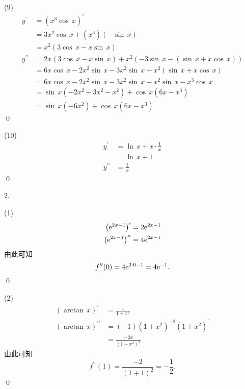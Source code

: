 (9) \solve
\begin{align}
    y^\prime &= \left(x^3\cos \, x\right)^\prime \\
    &=3x^2\cos \, x + \left(x^3\right)\left(-\sin \, x\right) \\
    &= x^2 \left(3\cos \, x - x \sin \, x\right) \\
    y^{\prime\prime} &= 2x \left(3\cos \, x-x\sin \, x\right) + x^2 \left(-3\sin \, x -\left(\sin \, x + x\cos \, x\right)\right) \\
    &= 6x\cos \, x -2x^2\sin \, x-3x^2 \sin \, x - x^2 \left(\sin \, x + x \cos \, x\right) \\
    &= 6x\cos \, x - 2x^2 \sin \, x - 3x^2 \sin \, x - x^2 \sin \, x - x^3 \cos \, x \\
    &= \sin \, x \left(-2x^2-3x^2-x^2\right) + \cos \, x \left(6x-x^3\right) \\
    &= \sin \, x \left(-6x^2\right) + \cos \, x \left(6x-x^3\right) 
\end{align}
\qed\bigskip

(10) \solve
\begin{align}
    y^\prime &= \ln \, x + x \cdot \frac{1}{x} \\
    &= \ln \, x + 1 \\
    y^{\prime\prime} &= \frac{1}{x}
\end{align}
\qed\bigskip

2. 
\bigskip

(1) \solve
\begin{align}
    \left(\mathrm{e}^{2x-1}\right)^\prime &= 2\mathrm{e}^{2x-1} \\
    \left(\mathrm{e}^{2x-1}\right)^{\prime\prime} &= 4\mathrm{e}^{2x-1}
\end{align}
由此可知
\begin{equation}
    f^{\prime\prime}(0)=4\mathrm{e}^{2\cdot 0-1} = 4\mathrm{e}^{-1}.
\end{equation}
\qed\bigskip

(2) \solve
\begin{align}
    \left(\arctan \, x\right)^{\prime} &= \frac{1}{1+x^2} \\
    \left(\arctan \, x\right)^{\prime\prime} &= \left(-1\right)\left(1+x^2\right)^{-2}\left(1+x^2\right)^\prime \\
    &= \frac{-2x}{(1+x^2)^2}
\end{align}
由此可知
\begin{equation}
    f^{\prime\prime}(1) = \frac{-2}{(1+1)^2} = -\frac{1}{2}.
\end{equation}
\qed\bigskip

